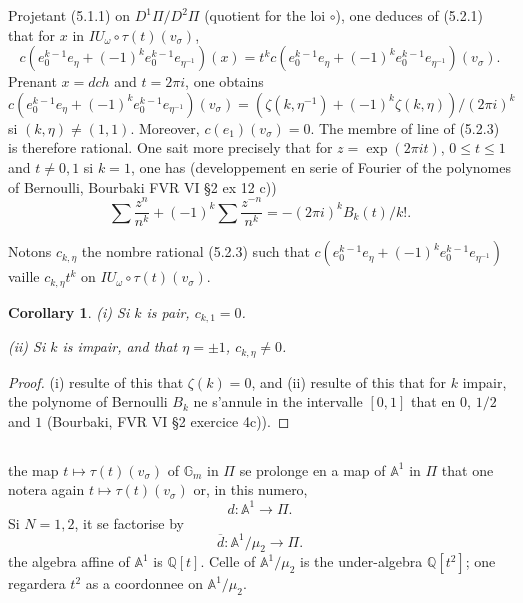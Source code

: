 \documentclass[11pt,a4paper]{article}
\theoremstyle{plain}
\newtheorem{corollary}[theorem]{Corollary}
\theoremstyle{definition}
\newcommand{\dch}{\mathit{dch}}
\newcommand{\Gm}{\mathbb{G}_m}
\newcommand{\Q}{\mathbb{Q}}
\newcommand{\A}{\mathbb{A}}
\begin{document}
Projetant (5.1.1) on $D^1\Pi/D^2\Pi$ (quotient for the loi $\circ$), one deduces of (5.2.1) that for $x$ in $IU_\omega \circ \tau(t)(v_\sigma)$,
\begin{equation}\label{eq:5.2.2}
c(e_0^{k-1}e_\eta + (-1)^k e_0^{k-1}e_{\eta^{-1}})(x) = t^k c(e_0^{k-1}e_\eta + (-1)^k e_0^{k-1}e_{\eta^{-1}})(v_\sigma).
\end{equation}
Prenant $x = \dch$ and $t = 2\pi i$, one obtains
\begin{equation}\label{eq:5.2.3}
c(e_0^{k-1}e_\eta + (-1)^k e_0^{k-1}e_{\eta^{-1}})(v_\sigma) = (\zeta(k, \eta^{-1}) + (-1)^k \zeta(k, \eta))/(2\pi i)^k
\end{equation}
si $(k, \eta) \neq (1,1)$. Moreover, $c(e_1)(v_\sigma) = 0$. The membre of line of (5.2.3) is therefore rational. One sait more precisely that for $z = \exp(2\pi it)$, $0 \leq t \leq 1$ and $t \neq 0, 1$ si $k=1$, one has (developpement en serie of Fourier of the polynomes of Bernoulli, Bourbaki FVR VI \S 2 ex 12 c))
\begin{equation}\label{eq:5.2.4}
\sum \frac{z^n}{n^k} + (-1)^k \sum \frac{z^{-n}}{n^k} = -(2\pi i)^k B_k(t)/k!.
\end{equation}

Notons $c_{k,\eta}$ the nombre rational (5.2.3) such that $c(e_0^{k-1}e_\eta + (-1)^k e_0^{k-1}e_{\eta^{-1}})$ vaille $c_{k,\eta} t^k$ on $IU_\omega \circ \tau(t)(v_\sigma)$.

\begin{corollary}\label{cor:5.3}
\emph{(i)} Si $k$ is pair, $c_{k,1} = 0$.

\emph{(ii)} Si $k$ is impair, and that $\eta = \pm 1$, $c_{k,\eta} \neq 0$.
\end{corollary}

\begin{proof}
(i) resulte of this that $\zeta(k) = 0$, and (ii) resulte of this that for $k$ impair, the polynome of Bernoulli $B_k$ ne s'annule in the intervalle $[0,1]$ that en $0$, $1/2$ and $1$ (Bourbaki, FVR VI \S 2 exercice 4c)).
\end{proof}

\subsection{}
the map $t \mapsto \tau(t)(v_\sigma)$ of $\Gm$ in $\Pi$ se prolonge en a map of $\A^1$ in $\Pi$ that one notera again $t \mapsto \tau(t)(v_\sigma)$ or, in this numero,
\begin{equation}\label{eq:5.4.1}
d: \A^1 \to \Pi.
\end{equation}
Si $N=1,2$, it se factorise by
\begin{equation}\label{eq:5.4.2}
\overline{d}: \A^1/\mu_2 \to \Pi.
\end{equation}
the algebra affine of $\A^1$ is $\Q[t]$. Celle of $\A^1/\mu_2$ is the under-algebra $\Q[t^2]$; one regardera $t^2$ as a coordonnee on $\A^1/\mu_2$.
\end{document}
